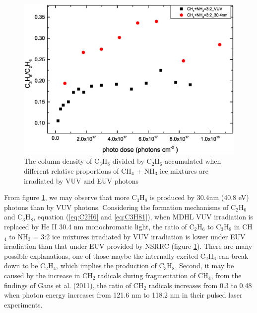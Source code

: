 \begin{figure}
\centering
\includegraphics[width=\textwidth]{figures/chapter3/NSRRC_Lab_C3H8_C2H6.eps}
\caption{The column density of C$_3$H$_8$ divided by C$_2$H$_6$ accumulated when different relative proportions of CH$_4$ + NH$_3$ ice mixtures are irradiated by VUV and EUV photons}
\label{fig:NSRRC_Lab_C3H8_C2H6}
\end{figure}


From figure \ref{fig:NSRRC_Lab_C3H8_C2H6}, we may observe that more C$_3$H$_8$ is produced by 30.4nm (40.8 eV) photons than by VUV photons. Considering the formation mechanisms of C$_2$H$_6$ and C$_3$H$_8$, equation (\ref{eq:C2H6} and \ref{eq:C3H81}), when MDHL VUV irradiation is replaced by He II 30.4 nm monochromatic light, the ratio of C$_2$H$_6$ to C$_3$H$_8$ in CH$_4$ to NH$_3$ = 3:2 ice mixtures irradiated by VUV irradiation is lower under EUV irradiation than that  under EUV provided by NSRRC (figure \ref{fig:NSRRC_Lab_C3H8_C2H6}). There are many possible explanations, one of those maybe the internally excited C$_2$H$_6$ can break down to be C$_2$H$_4$, which implies the production of C$_3$H$_8$. Second, it may be caused by the increase in CH$_2$ radicals during fragmentation of CH$_4$, from the findings of Gans et al. (2011)\cite{gans2011photolysis}, the ratio of CH$_2$ radicals increases from 0.3 to 0.48 when photon energy increases from 121.6 nm to 118.2 nm in their pulsed laser experiments.\\


